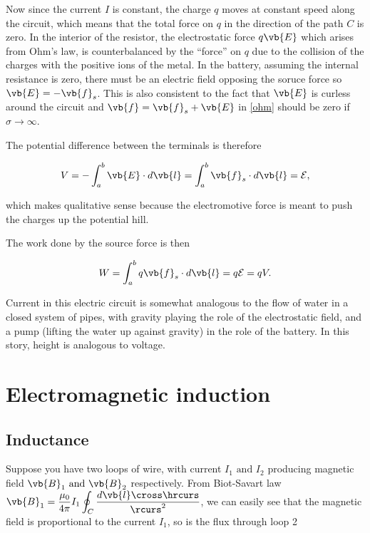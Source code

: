 \documentclass[english,a4paper,12pt]{report}
\begin{document}
Now since the current \(I\) is constant, the charge \(q\) moves at constant speed along the circuit, which means that the total force on \(q\) in the direction of the path \(C\) is zero. In the interior of the resistor, the electrostatic force \( q\vb{E}  \) which arises from Ohm's law, is counterbalanced by the ``force'' on \(q\) due to the collision of the charges with the positive ions of the metal. In the battery, assuming the internal resistance is zero, there must be an electric field opposing the soruce force so \(\vb{E} = - \vb{f} _{s} \). This is also consistent to the fact that \(\vb{E} \) is curless around the circuit and \(\vb{f} = \vb{f} _{s} + \vb{E}  \) in \cref{ohm} should be zero if \(\sigma \rightarrow \infty\). 

The potential difference between the terminals is therefore 

\begin{equation}
    V = -\int_{a}^{b} \vb{E} \cdot d \vb{l} = \int_{a}^{b} \vb{f} _{s} \cdot d \vb{l} = \mathcal{E},
\end{equation}

which makes qualitative sense because the electromotive force is meant to push the charges up the potential hill.

The work done by the source force is then 

\begin{equation}
    W = \int_{a}^{b} q \vb{f} _{s} \cdot d \vb{l} = q \mathcal{E} = qV.
\end{equation}



Current in this electric circuit is somewhat analogous to the flow of water in a closed system of pipes, with gravity playing the role of the electrostatic field, and a pump (lifting the water up against gravity) in the role of the battery. In this story, height is analogous to voltage.

\chapter{Electromagnetic induction}

\section{Inductance}

Suppose you have two loops of wire, with current \(I_1 \text { and } I_2 \) producing magnetic field \(\vb{B} _{1} \text { and } \vb{B} _{2}\) respectively. From Biot-Savart law \(\displaystyle \vb{B} _{1} = \frac{\mu _{0} }{4\pi } I_1 \oint_{C}\frac{d \vb{l} \cross \hrcurs }{\rcurs ^2 }   \), we can easily see that the magnetic field is proportional to the current \(I_1 \), so is the flux through loop 2 
\end{document}
